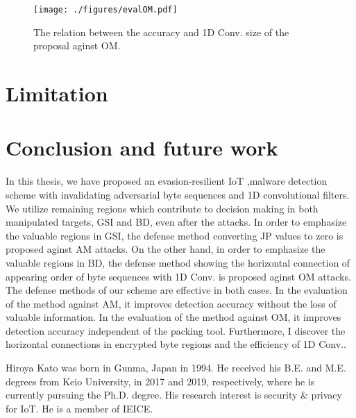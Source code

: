 \documentclass{ieeeaccess}
\begin{document}
\begin{figure}[h]
 \centering
 \texttt{[image: ./figures/evalOM.pdf]}
 \caption{The relation between the accuracy and 1D Conv. size of the proposal aginst OM.} 
 \label{fig:evalOM}
\end{figure}

\section{Limitation} \label{sec:limitation}
\section{Conclusion and future work} \label{sec:conclusion}
In this thesis, we have proposed an evasion-resilient IoT ,malware detection scheme with invalidating adversarial byte sequences and 1D convolutional filters. 
We utilize remaining regions which contribute to decision making in both manipulated targets, GSI and BD, even after the attacks.
In order to emphasize the valuable regions in GSI, the defense method converting JP values to zero is proposed aginst AM attacks.
On the other hand, in order to emphasize the valuable regions in BD, the defense method showing the horizontal connection of appearing order of byte sequences with 1D Conv. is proposed aginst OM attacks.
The defense methods of our scheme are effective in both cases.
In the evaluation of the method against AM, it improves detection accuracy without the loss of valuable information.
In the evaluation of the method against OM, it improves detection accuracy independent of the packing tool.
Furthermore, I discover the horizontal connections in encrypted byte regions and the efficiency of 1D Conv..



\begin{IEEEbiography}{Hiroya Kato} was born in Gunma, Japan in 1994. He received his B.E. and M.E. degrees from Keio University, in 2017 and 2019, respectively, where he is currently pursuing the Ph.D. degree. His research interest is security \& privacy for IoT. He is a member of IEICE.
\end{IEEEbiography} 
\end{document}
